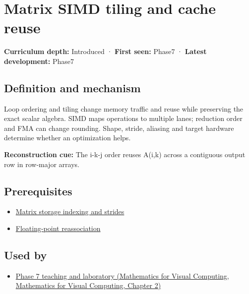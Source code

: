 \hypertarget{appendix-1bfb7c657105}{}\label{referencestart:appendix-1bfb7c657105}
\section{Matrix SIMD tiling and cache reuse}\label{appendix-1bfb7c657105-matrix-simd-tiling-and-cache-reuse}

\textbf{Curriculum depth:} Introduced · \textbf{First seen:} Phase7 · \textbf{Latest development:} Phase7

\subsection{Definition and mechanism}\label{appendix-1bfb7c657105-definition-and-mechanism}

Loop ordering and tiling change memory traffic and reuse while preserving the exact scalar algebra. SIMD maps operations to multiple lanes; reduction order and FMA can change rounding. Shape, stride, aliasing and target hardware determine whether an optimization helps.

\textbf{Reconstruction cue:} The i-k-j order reuses A(i,k) across a contiguous output row in row-major arrays.

\subsection{Prerequisites}\label{appendix-1bfb7c657105-prerequisites}

\begin{itemize}
\tightlist
\item
  \hyperref[appendix-ffdc1d4e5350]{Matrix storage indexing and strides}
\item
  \hyperref[appendix-c2ac4a84c283]{Floating-point reassociation}
\end{itemize}

\subsection{Used by}\label{appendix-1bfb7c657105-used-by}

\begin{itemize}
\tightlist
\item
  \href{../02-Mathematics-for-Visual-Computing/main.pdf\#nameddest=01-foundations-i-ch018-keep-the-promises-visible-while-moving-between-representations}{Phase 7 teaching and laboratory (Mathematics for Visual Computing, Mathematics for Visual Computing, Chapter 2)}
\end{itemize}

